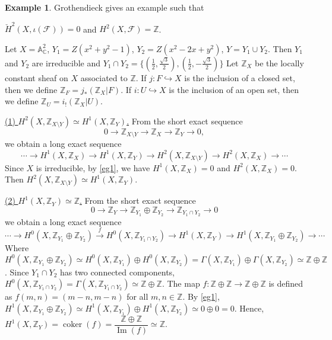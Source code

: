 \documentclass{amsart}
\numberwithin{equation}{section}
\theoremstyle{plain}
\theoremstyle{definition}
\newtheorem{eg}[equation]{Example}
\DeclareMathOperator{\cok}{coker}
\DeclareMathOperator{\im}{Im}
\begin{document}
\begin{eg}
	Grothendieck \cite[3.8.3]{Gro57} gives an example such that 
	
	\begin{center}
		$ \check H^2(X, \iota(\mathscr F))=0$ and $ H^2(X, \mathscr F)=\mathbb Z $. 
	\end{center}%

	Let $ X=\mathbb A_{\mathbb C}^2 $, $ Y_1=Z(x^2+y^2-1) $, $ Y_2=Z(x^2-2x+y^2) $, $ Y=Y_1\cup Y_2 $. Then $ Y_1 $ and $ Y_2 $ are irreducible and $ Y_1\cap Y_2=\{(\frac{1}{2}, \frac{\sqrt{3}}{2}), (\frac{1}{2}, -\frac{\sqrt{3}}{2})\} $
	Let $ \mathbb Z_X $ be the locally constant sheaf on $ X $ associated to $ \mathbb Z $. 
	If $ j: F\hookrightarrow X $ is the inclusion of a closed set, then we define $ \mathbb Z_F=j_*(\mathbb Z_X|F) $. 
	If $ i: U\hookrightarrow X $ is the inclusion of an open set, then we define $ \mathbb Z_{U}=i_!(\mathbb Z_X|U) $.
	
	\underline{(1) $ H^2(X, \mathbb Z_{X\setminus Y})\simeq H^1(X, \mathbb Z_Y) $.} From the short exact sequence 
	\[0\to \mathbb Z_{X\setminus Y}\to \mathbb Z_X\to \mathbb Z_Y\to 0,\]
	we obtain a long exact sequence 
	\[
	\cdots\to H^1(X, \mathbb Z_X)\to H^1(X, \mathbb Z_Y)\to H^2(X, \mathbb Z_{X\setminus Y})\to H^2(X, \mathbb Z_X)\to \cdots
	\]
	Since $ X $ is irreducible, by \cref{eg1}, we have $ H^1(X, \mathbb Z_X)=0 $ and $ H^2(X, \mathbb Z_X)=0 $. Then $ H^2(X, \mathbb Z_{X\setminus Y})\simeq H^1(X, \mathbb Z_Y) $. 
	
	\underline{(2) $ H^1(X, \mathbb Z_Y)\simeq \mathbb Z $.} From the short exact sequence 
	\[0\to \mathbb Z_Y\to \mathbb Z_{Y_1}\oplus\mathbb Z_{Y_2}\to \mathbb Z_{Y_1\cap Y_2}\to 0\]
	we obtain a long exact sequence 
	\[
	\cdots\to H^0(X, \mathbb Z_{Y_1}\oplus\mathbb Z_{Y_2})\xrightarrow{f} H^0(X, \mathbb Z_{Y_1\cap Y_2})\to H^1(X, \mathbb Z_{Y})\to H^1(X, \mathbb Z_{Y_1}\oplus\mathbb Z_{Y_2})\to \cdots
	\]
	Where $ H^0(X, \mathbb Z_{Y_1}\oplus\mathbb Z_{Y_2})\simeq  H^0(X, \mathbb Z_{Y_1})\oplus  H^0(X, \mathbb Z_{Y_2})= \Gamma(X, \mathbb Z_{Y_1})\oplus\Gamma(X, \mathbb Z_{Y_2})\simeq\mathbb Z\oplus\mathbb Z$. 
	Since $ Y_1\cap Y_2 $ has two connected components, $ H^0(X, \mathbb Z_{Y_1\cap Y_2})=\Gamma(X, \mathbb Z_{Y_1\cap Y_2})\simeq \mathbb Z\oplus\mathbb Z $. 
	The map $ f: \mathbb Z\oplus\mathbb Z\to  \mathbb Z\oplus\mathbb Z$ is defined as $ f(m,n)=(m-n,m-n) $ for all $ m,n\in\mathbb Z $. 
	By \cref{eg1}, $ H^1(X, \mathbb Z_{Y_1}\oplus\mathbb Z_{Y_2}) \simeq H^1(X, \mathbb Z_{Y_1})\oplus H^1(X, \mathbb Z_{Y_2})\simeq 0\oplus 0=0$. 
	Hence, $ H^1(X, \mathbb Z_Y)=\cok(f)=\dfrac{\mathbb Z\oplus\mathbb Z}{\im(f)}\simeq\mathbb Z $. 
	

\end{eg}
\end{document}
